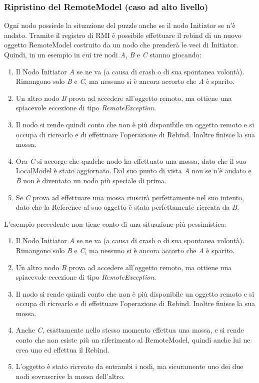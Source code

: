 \subsubsection{Ripristino del RemoteModel (caso ad alto livello)}
Ogni nodo possiede la situazione del puzzle anche se il nodo Initiator se n'è andato. Tramite il registro di RMI è possibile effettuare il rebind di un nuovo oggetto RemoteModel costruito da un nodo che prenderà le veci di Initiator.\newline
Quindi, in un esempio in cui tre nodi \textit{A}, \textit{B} e \textit{C} stanno giocando:
\begin{enumerate}
    \item Il Nodo Initiator \textit{A} se ne va (a causa di crash o di sua spontanea volontà). Rimangono solo \textit{B} e \textit{C}, ma nessuno si è ancora accorto che \textit{A} è sparito.
    \item Un altro nodo \textit{B} prova ad accedere all'oggetto remoto, ma ottiene una spiacevole eccezione di tipo \textit{RemoteException}.
    \item Il nodo si rende quindi conto che non è più disponibile un oggetto remoto e si occupa di ricrearlo e di effettuare l'operazione di Rebind. Inoltre finisce la sua mossa.
    \item Ora \textit{C} si accorge che qualche nodo ha effettuato una mossa, dato che il suo LocalModel è stato aggiornato. Dal suo punto di vista \textit{A} non se n'è andato e \textit{B} non è diventato un nodo più speciale di prima.
    \item Se \textit{C} prova ad effettuare una mossa riuscirà perfettamente nel suo intento, dato che la Reference al suo oggetto è stata perfettamente ricreata da \textit{B}.
\end{enumerate}

\noindent L'esempio precedente non tiene conto di una situazione più pessimistica:

\begin{enumerate}
    \item Il Nodo Initiator \textit{A} se ne va (a causa di crash o di sua spontanea volontà). Rimangono solo \textit{B} e \textit{C}, ma nessuno si è ancora accorto che \textit{A} è sparito.
    \item Un altro nodo \textit{B} prova ad accedere all'oggetto remoto, ma ottiene una spiacevole eccezione di tipo \textit{RemoteException}.
    \item Il nodo si rende quindi conto che non è più disponibile un oggetto remoto e si occupa di ricrearlo e di effettuare l'operazione di Rebind. Inoltre finisce la sua mossa.
    \item Anche \textit{C}, esattamente nello stesso momento effettua una mossa, e si rende conto che non esiste più un riferimento al RemoteModel, quindi anche lui ne crea uno ed effettua il Rebind.
    \item L'oggetto è stato ricreato da entrambi i nodi, ma sicuramente uno dei due nodi sovrascrive la mossa dell'altro.
\end{enumerate}

